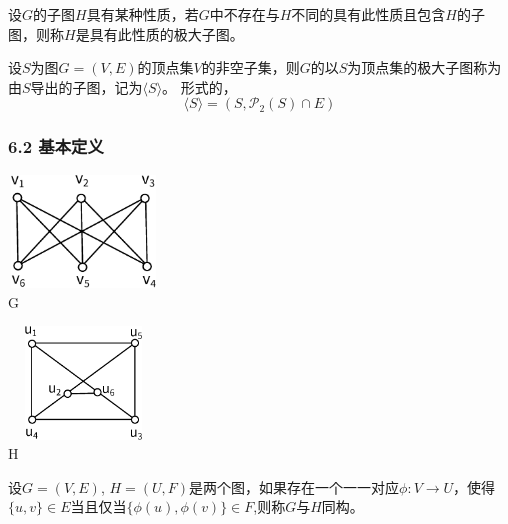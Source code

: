 \documentclass{beamer}
\begin{document}
\begin{CJK}{UTF8}{gbsn}
\begin{frame}
    \pause
  \begin{definition6.2.8}
    设$G$的子图$H$具有某种性质，若$G$中不存在与$H$不同的具有此性质且包含$H$的子图，则称$H$是具有此性质的\alert{极大子图}。
  \end{definition6.2.8}
\pause
  \begin{definition6.2.9}
    设$S$为图$G=(V,E)$的顶点集$V$的非空子集，则$G$的以$S$为顶点集的极大子图称为由$S$导出的子图，记为$\langle S \rangle$。
形式的，
\begin{equation*}
  \langle S \rangle=(S, \mathcal{P}_2(S) \cap E)
\end{equation*}
  \end{definition6.2.9}
\end{frame}
\begin{frame}
  \frametitle{6.2 基本定义}
    \begin{minipage}[c]{0.4\textwidth}
\includegraphics[width=4cm,height=3cm]{k33} \\ \centering G 
    \end{minipage}\hspace{2cm}
    \begin{minipage}[c]{0.4\textwidth}
\includegraphics[width=4cm,height=3cm]{isomorphic} \\ \centering H 
    \end{minipage}
    \pause
  \begin{definition6.2.10}
    设$G=(V,E)$, $H = (U, F)$是两个图，如果存在一个一一对应$\phi:V \to
    U$，使得$\{u,v\} \in E$当且仅当$\{\phi(u),\phi(v)\} \in F$,则称$G$与$H$\alert{同构}。
  \end{definition6.2.10}
\end{frame}


\end{CJK}
\end{document}
